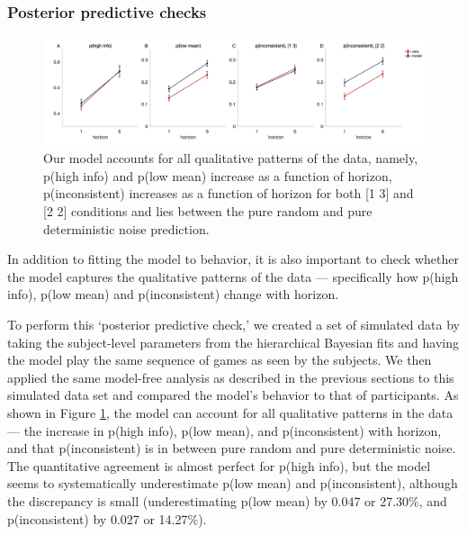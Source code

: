 \documentclass[12pt]{article}
\begin{document}
	\subsubsection*{Posterior predictive checks}
	\begin{figure}[hp]
		\begin{center}
			\includegraphics[width=1\textwidth]{figures/pinconsistent_6panel_age_acchance.png}
			\caption{
			Our model accounts for all qualitative patterns of the data, namely, p(high info) and p(low mean) increase as a function of horizon, p(inconsistent) increases as a function of horizon for both [1 3] and [2 2] conditions and lies between the pure random and pure deterministic noise prediction.}
			\label{fig:mb3}
		\end{center}
	\end{figure}
	
	In addition to fitting the model to behavior, it is also important to check whether the model captures the qualitative patterns of the data \citep{Wilson2019} --- specifically how p(high info), p(low mean) and p(inconsistent) change with horizon.
	
	To perform this `posterior predictive check,' we created a set of simulated data by taking the subject-level parameters from the hierarchical Bayesian fits and having the model play the same sequence of games as seen by the subjects. We then applied the same model-free analysis as described in the previous sections to this simulated data set and compared the model's behavior to that of participants. As shown in Figure  \ref{fig:mb3}, the model can account for all qualitative patterns in the data --- the increase in p(high info), p(low mean), and p(inconsistent) with horizon, and that p(inconsistent) is in between pure random and pure deterministic noise.  The quantitative agreement is almost perfect for p(high info), but the model seems to systematically underestimate p(low mean) and p(inconsistent), although the discrepancy is small (underestimating p(low mean) by 0.047 or 27.30\%, and p(inconsistent) by 0.027 or 14.27\%).
	
\end{document}
